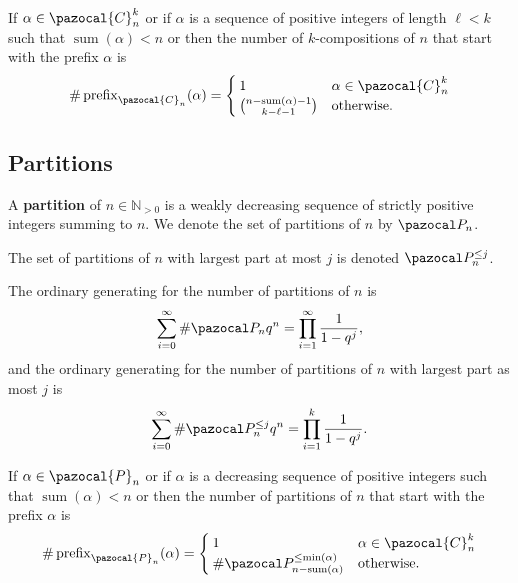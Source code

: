 \begin{proposition}
  If $\alpha \in \pazocal{C}_n^{k}$ or if $\alpha$ is
  a sequence of positive integers of length $\ell < k$ such that
  ${\operatorname{sum}(\alpha) < n}$ or
  then the number of $k$-compositions of $n$ that start with the prefix $\alpha$
  is \[
    \#\operatorname{prefix}_{\pazocal{C}_n}(\alpha) = \begin{cases}
      1 & \alpha \in \pazocal{C}_n^{k} \\
      \binom{n - \operatorname{sum}(\alpha) - 1}{k - \ell - 1} & \text{otherwise}.
    \end{cases}
  \]
\end{proposition}

\subsection{Partitions}
\begin{definition}
  A \textbf{partition} of $n \in \mathbb{N}_{>0}$ is a weakly decreasing
  sequence of strictly positive integers summing to $n$. We denote the set of
  partitions of $n$ by $\pazocal P_n$.

  The set of partitions of $n$ with largest part at most
  $j$ is denoted $\pazocal P_n^{\leq j}$.
\end{definition}

\begin{lemma}
  The ordinary generating for the number of partitions of $n$ is \[
    \sum_{i=0}^\infty \#\pazocal P_n q^n = \prod_{i=1}^\infty \frac{1}{1-q^j},
  \]
  and the ordinary generating for the number of partitions of $n$ with largest part
  as most $j$ is \[
    \sum_{i=0}^\infty \#\pazocal P_n^{\leq j} q^n = \prod_{i=1}^k \frac{1}{1-q^j}.
  \]
\end{lemma}

\begin{proposition}
  If $\alpha \in \pazocal{P}_n$ or if $\alpha$ is
  a decreasing sequence of positive integers such that ${\operatorname{sum}(\alpha) < n}$ or
  then the number of partitions of $n$ that start with the prefix $\alpha$
  is \[
    \#\operatorname{prefix}_{\pazocal{P}_n}(\alpha) = \begin{cases}
      1 & \alpha \in \pazocal{C}_n^{k} \\
      \#\pazocal P_{n-\operatorname{sum}(\alpha)}^{\leq \operatorname{min}(\alpha)} & \text{otherwise}.
    \end{cases}
  \]
\end{proposition}
